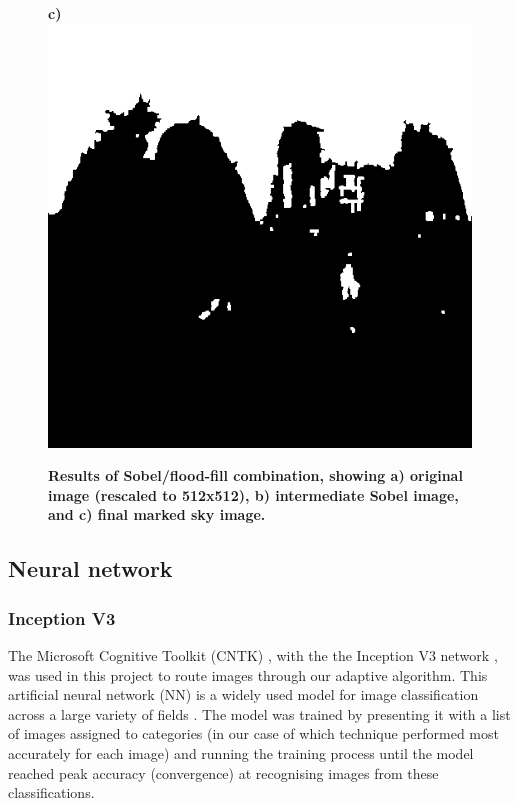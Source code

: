\documentclass[final,3p,times,authoryear]{elsarticle}
\begin{document}
\begin{figure}
\textbf{c)}\includegraphics[scale=0.27]{Images/2/FloodfillOutput.png}
\caption{\bf   Results of Sobel/flood-fill combination, showing a) original image (rescaled to 512x512), b) intermediate Sobel image, and c) final marked sky image.}    
 \label{fig:sobelflood}  
\end{figure} 

\subsection{Neural network}\label{sec:nn}

\subsubsection{Inception V3}\label{sec:inception}
The Microsoft Cognitive Toolkit (CNTK) \citep{Yu2015,Agarwal2016}, with the the Inception V3 network \citep{Szegedy2015a}, was used in this project to route images through our adaptive algorithm. This artificial neural network (NN) is a widely used model for image classification across a large variety of fields \citep{Xia2017,Hassannejad2016}. The model was trained by presenting it with a list of images assigned to categories (in our case of which technique performed most accurately for each image) and running the training process until the model reached peak accuracy (convergence) at recognising images from these classifications.
\end{document}
